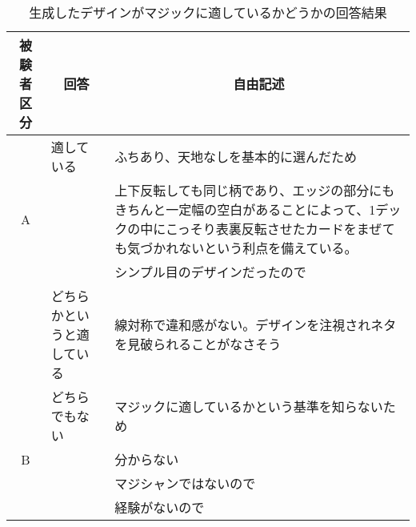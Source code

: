 \begin{table}[htbp]
    \centering    \caption{生成したデザインがマジックに適しているかどうかの回答結果}
    \begin{tabular}{|c|p{7em}|p{26em}|} \hline
        被験者区分 & \multicolumn{1}{|c|}{回答} & \multicolumn{1}{|c|}{自由記述} \\ \hline
          &  適している& ふちあり、天地なしを基本的に選んだため \\\cline{3-3}
         A & &上下反転しても同じ柄であり、エッジの部分にもきちんと一定幅の空白があることによって、1デックの中にこっそり表裏反転させたカードをまぜても気づかれないという利点を備えている。\\\cline{3-3}
          & &シンプル目のデザインだったので\\\hline
        & どちらかというと適している& 線対称で違和感がない。デザインを注視されネタを見破られることがなさそう \\ \cline{2-3}
         & どちらでもない&   マジックに適しているかという基準を知らないため \\\cline{3-3}
       B  & & 分からない \\\cline{3-3}
       & &マジシャンではないので\\\cline{3-3}
        & &経験がないので\\ \hline

    \end{tabular}
    \label{free1}
\end{table}

